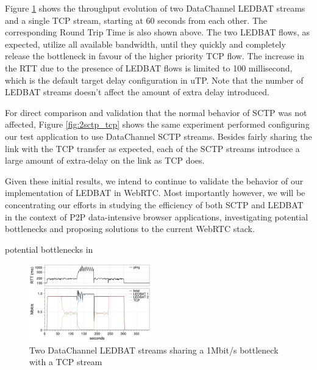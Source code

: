 \documentclass{sig-alternate}
\begin{document}
Figure \ref{fig:2ledbat_tcp} shows the throughput evolution of two DataChannel LEDBAT
streams and a single TCP stream, starting at 60 seconds from each other. The corresponding
Round Trip Time is also shown above. The two LEDBAT flows, as expected, utilize all
available bandwidth, until they quickly and completely release the bottleneck in favour of
the higher priority TCP flow. The increase in the RTT due to the presence of LEDBAT flows
is limited to 100 millisecond, which is the default target delay configuration in
uTP. Note that the number of LEDBAT streams doesn't affect the amount of extra delay
introduced.


For direct comparison and validation that the normal behavior of SCTP was not affected,
Figure \ref{fig:2sctp_tcp} shows the same experiment performed configuring our test
application to use DataChannel SCTP streams. Besides fairly sharing the link with the TCP
transfer as expected, each of the SCTP streams introduce a large amount of extra-delay on
the link as TCP does.

Given these initial results, we intend to continue to validate the behavior of our
implementation of LEDBAT in WebRTC. Most importantly however, we will be concentrating our
efforts in studying the efficiency of both SCTP and LEDBAT in the context of P2P
data-intensive browser applications, investigating potential bottlenecks and proposing
solutions to the current WebRTC stack.

potential bottlenecks in

\begin{figure}[t]
  \centering
    \includegraphics[width=0.47\textwidth]{figs/2ledbat_tcp}
\vspace*{-0.38cm}
	\caption{Two DataChannel LEDBAT streams sharing a 1Mbit/s bottleneck with a TCP stream} \label{fig:2ledbat_tcp}
\vspace*{-0.4cm}
\end{figure}
\end{document}
